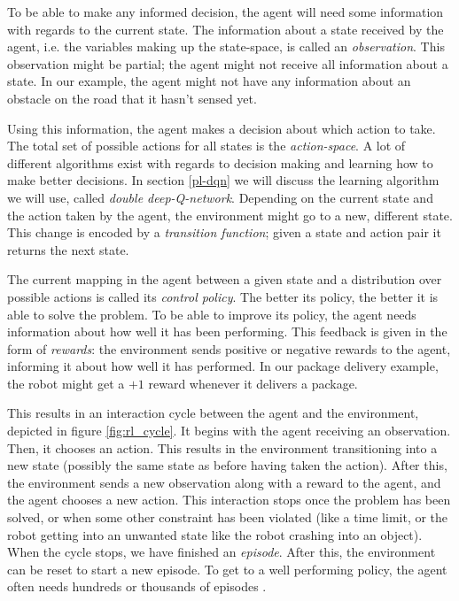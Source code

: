 To be able to make any informed decision, the agent will need some information with regards to the current state. The information about a state received by the agent, i.e. the variables making up the state-space, is called an \emph{observation}. This observation might be partial; the agent might not receive all information about a state. In our example, the agent might not have any information about an obstacle on the road that it hasn't sensed yet.

Using this information, the agent makes a decision  about which action to take. The total set of possible actions for all states is the \emph{action-space}. A lot of different algorithms exist with regards to decision making and learning how to make better decisions. In section \ref{pl-dqn} we will discuss the learning algorithm we will use, called \emph{double deep-Q-network}. Depending on the current state and the action taken by the agent, the environment might go to a new, different state. This change is encoded by a \emph{transition function}; given a state and action pair it returns the next state. 

The current mapping in the agent between a given state and a distribution over possible actions is called its \emph{control policy}. The better its policy, the better it is able to solve the problem. To be able to improve its policy, the agent needs information about how well it has been performing. This feedback is given in the form of \emph{rewards}: the environment sends positive or negative rewards to the agent, informing it about how well it has performed. In our package delivery example, the robot might get a $+1$ reward whenever it delivers a package.

This results in an interaction cycle between the agent and the environment, depicted in figure \ref{fig:rl_cycle}. It begins with the agent receiving an observation. Then, it chooses an action. This results in the environment transitioning into a new state (possibly the same state as before having taken the action). After this, the environment sends a new observation along with a reward to the agent, and the agent chooses a new action. This interaction stops once the problem has been solved, or when some other constraint has been violated (like a time limit, or the robot getting into an unwanted state like the robot crashing into an object). When the cycle stops, we have finished an \emph{episode}. After this, the environment can be reset to start a new episode. To get to a well performing policy, the agent often needs hundreds or thousands of episodes \cite[p. 6-10]{grokking}. 

